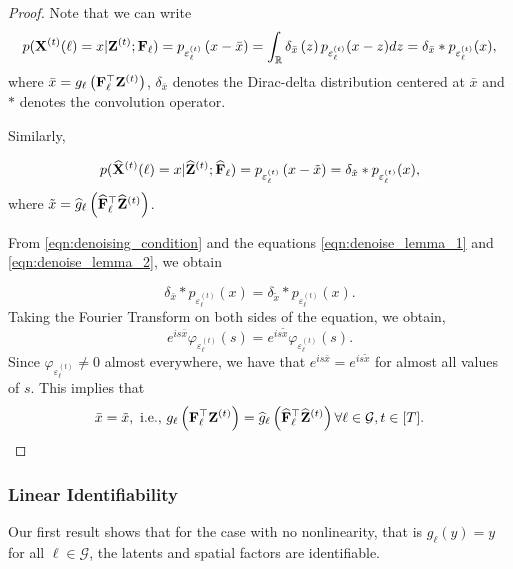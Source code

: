 {\begin{proof}
Note that we can write
\begin{equation}
    p(\mathbf{X}^{(t)}(\ell) = x | \mathbf{Z}^{(t)}; \mathbf{F}_{\ell}) = p_{\varepsilon_\ell^{(t)}} \left( x - \bar{x} \right) = \int_\mathbb{R} \delta_{\bar{x}} \left( z \right) p_{\varepsilon_\ell^{(t)}}(x-z) dz = \delta_{\bar{x}} * p_{\varepsilon_\ell^{(t)}} (x),
    \label{eqn:denoise_lemma_1}
\end{equation}
where $\bar{x} = {g}_{\ell} \left( \mathbf{F}_{\ell}^\top \mathbf{Z}^{(t)} \right)$, $\delta_{\bar{x}}$ denotes the Dirac-delta distribution centered at $\bar{x}$ and $*$ denotes the convolution operator.

Similarly,

\begin{equation}
    p(\widehat{\mathbf{X}}^{(t)}(\ell) = x | \widehat{\mathbf{Z}}^{(t)}; \widehat{\mathbf{F}}_{\ell}) = p_{\varepsilon_\ell^{(t)}} \left( x - \tilde{x} \right) = \delta_{\tilde{x}} * p_{\varepsilon_\ell^{(t)}} (x),
    \label{eqn:denoise_lemma_2}
\end{equation}
where $\tilde{x} = \widehat{g}_{\ell} \left( \widehat{\mathbf{F}}_{\ell}^\top \widehat{\mathbf{Z}}^{(t)} \right)$.

From \eqref{eqn:denoising_condition} and the equations \ref{eqn:denoise_lemma_1} and \ref{eqn:denoise_lemma_2}, we obtain

\begin{equation*}
    \delta_{\bar{x}} * p_{\varepsilon_\ell^{(t)}} (x) = \delta_{\tilde{x}} * p_{\varepsilon_\ell^{(t)}} (x).
\end{equation*}
Taking the Fourier Transform on both sides of the equation, we obtain,
\begin{equation*}
    e^{is\bar{x}} \varphi_{\varepsilon_\ell^{(t)}}(s) = e^{is\tilde{x}} \varphi_{\varepsilon_\ell^{(t)}}(s).
\end{equation*}
Since $\varphi_{\varepsilon_\ell^{(t)}}\neq 0$ almost everywhere, we have that $\displaystyle e^{is\bar{x}} = e^{is \tilde{x}}$ for almost all values of $s$. This implies that
\begin{equation*}
    \bar{x} = \tilde{x}, \text{ i.e., } {g}_{\ell} \left( \mathbf{F}_{\ell}^\top \mathbf{Z}^{(t)} \right) = \widehat{g}_{\ell} \left( \widehat{\mathbf{F}}_{\ell}^\top \widehat{\mathbf{Z}}^{(t)} \right) \forall \ell \in \mathcal{G}, t \in [T].
\end{equation*}
\end{proof}
}

\subsubsection{Linear Identifiability}
Our first result shows that for the case with no nonlinearity, that is $g_{\ell}(y) = y$ for all $\ell \in \mathcal{G}$, the latents and spatial factors are identifiable.


